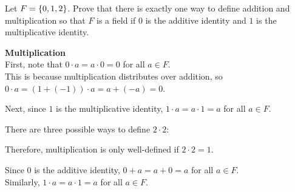 \begin{problem}
  Let $F = \left\{0, 1, 2\right\}$.
  Prove that there is exactly one way to define
  addition and multiplication so that $F$ is a field
  if $0$ is the additive identity and $1$ is the multiplicative identity.
\end{problem}

\begin{answer}

  \textbf{Multiplication} \\
  First, note that $0 \cdot a = a \cdot 0 = 0$ for all $a \in F$. \\
  This is because multiplication distributes over addition,
  so $0 \cdot a = (1 + (-1)) \cdot a = a + (-a) = 0$.

  \step
  Next, since $1$ is the multiplicative identity, $1 \cdot a = a \cdot 1 = a$ for all $a \in F$.

  \step
  There are three possible ways to define $2 \cdot 2$:

  \begin{enumarabic}
    \item {}
    \item {}
    \item Therefore, multiplication is only well-defined if $2 \cdot 2 = 1$.~\label{step:3times}
  \end{enumarabic}

  \step
  Since $0$ is the additive identity, $0 + a = a + 0 = a$ for all $a \in F$. \\
  Similarly, $ 1 \cdot a = a \cdot 1 = a$ for all $a \in F$.


\end{answer}
